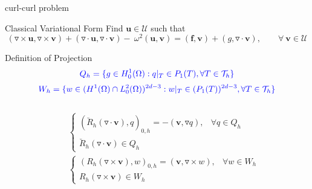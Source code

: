 \documentclass[13pt]{beamer}
\begin{document}
\begin{frame}[t]{curl-curl problem}
  \begin{block}{Classical Variational Form}
    Find $\mathbf{u}\in\mathcal{U}$ such that
    \[(\triangledown\times\mathbf{u},\triangledown\times\mathbf{v}) + (\triangledown\cdot\mathbf{u},\triangledown\cdot\mathbf{v}) - \
    \omega^2(\mathbf{u},\mathbf{v}) = (\mathbf{f},\mathbf{v}) + (g,\triangledown\cdot\mathbf{v}), \qquad \forall\ \mathbf{v}\in\mathcal{U}\]
  \end{block}
  \begin{block}{Definition of Projection}
    \[{\color{blue}Q_h = \{g\in H_{0}^{1}(\Omega): q|_T\in P_1(T), \forall T\in \mathcal{T}_h\}}\]
    \[{\color{blue}W_h = \{w\in (H^{1}(\Omega)\cap L^{2}_{0}(\Omega))^{2d-3}: w|_T\in (P_1(T))^{2d-3}, \forall T\in \mathcal{T}_h\}}\]\\[-5ex]
    \begin{eqnarray}
       && \left\{\begin{array}{cc}
        (\breve{R}_h(\triangledown\cdot\mathbf{v}),q)_{0,h} = - (\mathbf{v},\triangledown q), & \forall q\in Q_h \\
        \breve{R}_h(\triangledown\cdot\mathbf{v})\in Q_h
        \end{array}\right.\\
       && \left\{\begin{array}{cc}
        (R_h(\triangledown\times\mathbf{v}),w)_{0,h} = (\mathbf{v},\triangledown\times w), & \forall w\in W_h \\
        R_h(\triangledown\times\mathbf{v})\in W_h
        \end{array}\right.
    \end{eqnarray}
  \end{block}
\end{frame}
\end{document}

